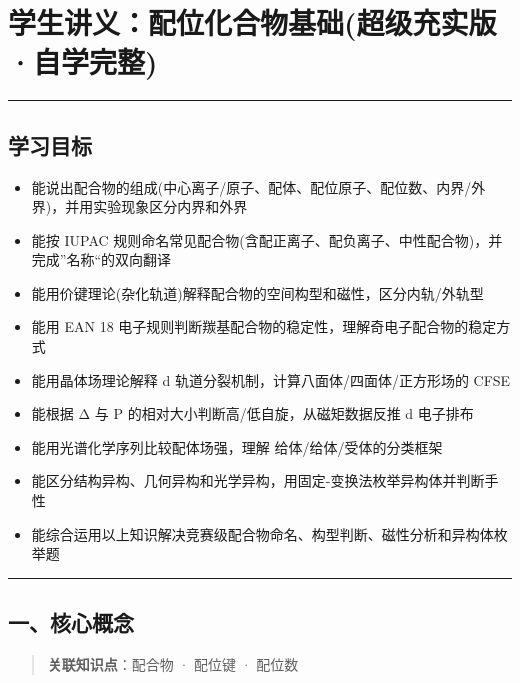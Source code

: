 \section{学生讲义：配位化合物基础(超级充实版·自学完整)}\label{ux5b66ux751fux8bb2ux4e49ux914dux4f4dux5316ux5408ux7269ux57faux7840ux8d85ux7ea7ux5145ux5b9eux7248ux81eaux5b66ux5b8cux6574}

\begin{center}\rule{0.5\linewidth}{0.5pt}\end{center}

\subsection{学习目标}\label{ux5b66ux4e60ux76eeux6807}

\begin{itemize}
\tightlist
\item
  能说出配合物的组成(中心离子/原子、配体、配位原子、配位数、内界/外界)，并用实验现象区分内界和外界
\item
  能按 IUPAC 规则命名常见配合物(含配正离子、配负离子、中性配合物)，并完成''名称``的双向翻译
\item
  能用价键理论(杂化轨道)解释配合物的空间构型和磁性，区分内轨/外轨型
\item
  能用 EAN 18 电子规则判断羰基配合物的稳定性，理解奇电子配合物的稳定方式
\item
  能用晶体场理论解释 d 轨道分裂机制，计算八面体/四面体/正方形场的 CFSE
\item
  能根据 Δ 与 P 的相对大小判断高/低自旋，从磁矩数据反推 d 电子排布
\item
  能用光谱化学序列比较配体场强，理解  给体/\派 给体/\派 受体的分类框架
\item
  能区分结构异构、几何异构和光学异构，用固定-变换法枚举异构体并判断手性
\item
  能综合运用以上知识解决竞赛级配合物命名、构型判断、磁性分析和异构体枚举题
\end{itemize}

\begin{center}\rule{0.5\linewidth}{0.5pt}\end{center}

\subsection{一、核心概念}\label{ux4e00ux6838ux5fc3ux6982ux5ff5}

\begin{quote}
\textbf{关联知识点}：配合物 · 配位键 · 配位数
\end{quote}

